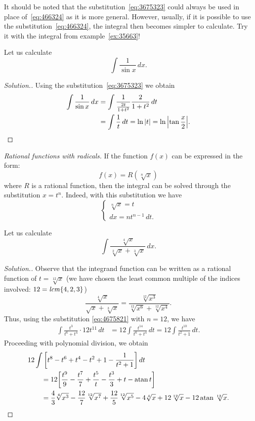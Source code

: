 \begin{remark}
It should be noted that the substitution~\eqref{eq:3675323} could always be
used in place of~\eqref{eq:466324} as it is more general.
However, usually, if it is possible to use the substitution~\eqref{eq:466324},
the integral then becomes simpler to calculate. Try it with the integral
from example~\ref{ex:35663}!
\end{remark}

\begin{example}
Let us calculate
\[
 \int \frac{1}{\sin x}\, dx.
\]
\end{example}
\begin{proof}[Solution.]
Using the substitution~\eqref{eq:3675323}
we obtain
\begin{align*}
  \int \frac{1}{\sin x}\, dx
  &= \int \frac{1}{\frac{2t}{1+t^2}}\frac{2}{1+t^2}\, dt \\
  &= \int \frac{1}{t}\, dt = \ln{\left|t\right|} = \ln {\left|\operatorname{tan}\frac x 2\right|}.
\end{align*}
\end{proof}

\emph{Rational functions with radicals.}
If the function $f(x)$ can be expressed in the form:
\[
  f(x) = R(\sqrt[n] x)
\]
where $R$ is a rational function, then the integral can be solved through
the substitution $x = t^n$. Indeed, with this substitution we have
\begin{equation}\label{eq:4675821}
\begin{cases}
  \sqrt[n] x = t\\
  dx = n t^{n-1}\, dt.
\end{cases}
\end{equation}

\begin{example}
Let us calculate
\[
  \int \frac{\sqrt[4]{x}}{\sqrt[2]{x} + \sqrt[3]{x}}\, dx.
\]
\end{example}
\begin{proof}[Solution.]
Observe that the integrand function can be written
as a rational function of $t=\sqrt[12]{x}$ (we have chosen
the least common multiple of the indices involved: $12 =
\mathit{lcm}{\left\{ 4,2,3 \right\}}$)
\[
  \frac{\sqrt[4]{x}}{\sqrt{x} + \sqrt[3]{x}}
  = \frac{\sqrt[12]{x^3}}{\sqrt[12]{x^6} + \sqrt[12]{x^4}}.
\]
Thus, using the substitution \eqref{eq:4675821} with $n=12$, we have
\begin{align*}
\int \frac{t^3}{t^6 + t^4}\cdot 12 t^{11}\, dt
&= 12 \int \frac{t^{14}}{t^6+t^4}\, dt
 = 12 \int \frac{t^{10}}{t^2+1}\, dt.
\end{align*}
Proceeding with polynomial division, we obtain
\begin{align*}
\MoveEqLeft{12 \int \Enclose{t^8 - t^6 + t^4 - t^2 + 1 - \frac{1}{t^2+1}}\, dt} \\
&= 12 \Enclose{\frac{t^9}{9} - \frac{t^7}{7} + \frac{t^5}{t} - \frac{t^3}{3} + t
- \arctg t} \\
&= \frac 4 3 \sqrt[4]{x^3} - \frac{12}{7}\sqrt[12]{x^7}
+ \frac{12}{5}\sqrt[12]{x^5} - 4 \sqrt[4]{x} + 12 \sqrt[12]{x} - 12 \arctg
\sqrt[12]{x}.
\end{align*}
\end{proof}